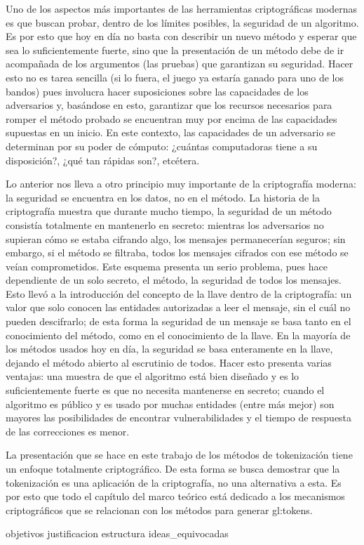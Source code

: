 Uno de los aspectos más importantes de las herramientas criptográficas
modernas es que buscan probar, dentro de los límites posibles, la
seguridad de un algoritmo. Es por esto que hoy en día no basta con
describir un nuevo método y esperar que sea lo suficientemente fuerte,
sino que la presentación de un método debe de ir acompañada de los
argumentos (las pruebas) que garantizan su seguridad. Hacer esto no es
tarea sencilla (si lo fuera, el juego ya estaría ganado para uno de los
bandos) pues involucra hacer suposiciones sobre las capacidades de
los adversarios y, basándose en esto, garantizar que los recursos necesarios
para romper el método probado se encuentran muy por encima de las capacidades
supuestas en un inicio. En este contexto, las capacidades de un adversario
se determinan por su poder de cómputo: ¿cuántas computadoras tiene a su
disposición?, ¿qué tan rápidas son?, etcétera.

Lo anterior nos lleva a otro principio muy importante de la criptografía
moderna: la seguridad se encuentra en los datos, no en el método. La historia
de la criptografía muestra que durante mucho tiempo, la seguridad de un método
consistía totalmente en mantenerlo en secreto: mientras los adversarios
no supieran cómo se estaba cifrando algo, los mensajes permanecerían seguros;
sin embargo, si el método se filtraba, todos los mensajes cifrados con ese
método se veían comprometidos. Este esquema presenta un serio problema,
pues hace dependiente de un solo secreto, el método, la seguridad de todos
los mensajes. Esto llevó a la introducción del concepto de la llave dentro
de la criptografía: un valor que solo conocen las entidades autorizadas a leer
el mensaje, sin el cuál no pueden descifrarlo; de esta forma la seguridad de un
mensaje se basa tanto en el conocimiento del método, como en el conocimiento
de la llave. En la mayoría de los métodos usados hoy en día, la seguridad se
basa enteramente en la llave, dejando el método abierto al escrutinio de todos.
Hacer esto presenta varias ventajas: una muestra de que el algoritmo está
bien diseñado y es lo suficientemente fuerte es que no necesita mantenerse en
secreto; cuando el algoritmo es público y es usado por muchas entidades (entre
más mejor) son mayores las posibilidades de encontrar vulnerabilidades y
el tiempo de respuesta de las correcciones es menor.

La presentación que se hace en este trabajo de los métodos de tokenización
tiene un enfoque totalmente criptográfico. De esta forma se busca demostrar
que la tokenización es una aplicación de la criptografía, no una alternativa
a esta. Es por esto que todo el capítulo del marco teórico está dedicado a los
mecanismos criptográficos que se relacionan con los métodos para generar
\glspl{gl:token}.

{objetivos}
{justificacion}
{estructura}
{ideas_equivocadas}
